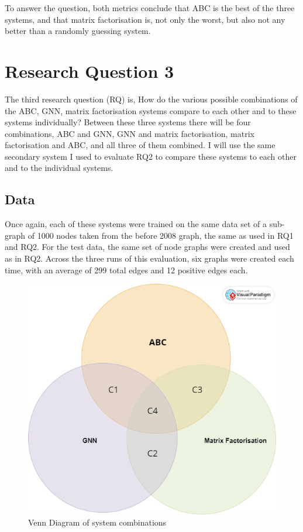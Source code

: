 \documentclass{l4proj}
\begin{document}
To answer the question, both metrics conclude that ABC is the best of the three systems, and that matrix factorisation is, not only the worst, but also not any better than a randomly guessing system. \\

\section{Research Question 3}

The third research question (RQ) is, How do the various possible combinations of the ABC, GNN, matrix factorisation systems compare to each other and to these systems individually? Between these three systems there will be four combinations, ABC and GNN, GNN and matrix factorisation, matrix factorisation and ABC, and all three of them combined. I will use the same secondary system I used to evaluate RQ2 to compare these systems to each other and to the individual systems. \\

\subsection{Data}

Once again, each of these systems were trained on the same data set of a sub-graph of 1000 nodes taken from the before 2008 graph, the same as used in RQ1 and RQ2. For the test data, the same set of node graphs were created and used as in RQ2. Across the three runs of this evaluation, six graphs were created each time, with an average of 299 total edges and 12 positive edges each. \\

\begin{figure}[h]
    \centering
    \includegraphics[width=0.6\linewidth]{images/Combination_venn.png}
    \caption{Venn Diagram of system combinations}
    \label{fig:venn}
\end{figure}
\end{document}
